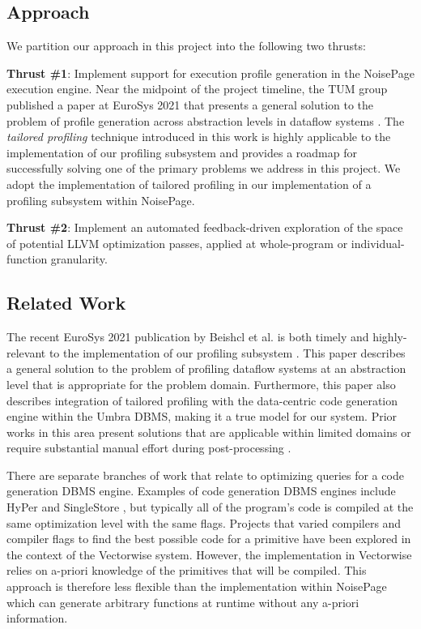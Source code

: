 \documentclass{vldb}
\begin{document}
\subsection{Approach}

We partition our approach in this project into the following two thrusts:

\textbf{Thrust \#1}: Implement support for execution profile generation in the NoisePage execution engine. Near the midpoint of the project timeline, the TUM group published a paper at EuroSys 2021 that presents a general solution to the problem of profile generation across abstraction levels in dataflow systems \cite{beischl21}. The \textit{tailored profiling} technique introduced in this work is highly applicable to the implementation of our profiling subsystem and provides a roadmap for successfully solving one of the primary problems we address in this project. We adopt the implementation of tailored profiling in  our implementation of a profiling subsystem within NoisePage. 

\textbf{Thrust \#2}: Implement an automated feedback-driven exploration of the space of potential LLVM optimization passes, applied at whole-program or individual-function granularity.

\subsection{Related Work}

The recent EuroSys 2021 publication by Beishcl et al. is both timely and highly-relevant to the implementation of our profiling subsystem \cite{beischl21}. This paper describes a general solution to the problem of profiling dataflow systems at an abstraction level that is appropriate for the problem domain. Furthermore, this paper also describes integration of tailored profiling with the data-centric code generation engine within the Umbra \cite{umbra} DBMS, making it a true model for our system. Prior works in this area present solutions that are applicable within limited domains \cite{stuart20} or require substantial manual effort during post-processing \cite{noll20}.

There are separate branches of work that relate to optimizing queries for a code generation DBMS engine. Examples of code generation DBMS engines include HyPer \cite{hyper} and SingleStore \cite{singlestore}, but typically all of the program's code is compiled at the same optimization level with the same flags. Projects that varied compilers and compiler flags to find the best possible code for a primitive have been explored in the context of the Vectorwise \cite{raducanu12} system. However, the implementation in Vectorwise relies on a-priori knowledge of the primitives that will be compiled. This approach is therefore less flexible than the implementation within NoisePage which can generate arbitrary functions at runtime without any a-priori information.
\end{document}
